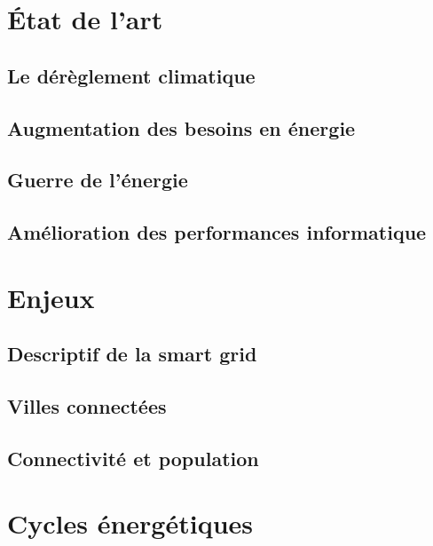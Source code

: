 \chapter{État de l’art}
\section{Le dérèglement climatique}
\lipsum
\section{Augmentation des besoins en énergie}
\lipsum
\section{Guerre de l'énergie}
\lipsum
\section{Amélioration des performances informatique}
\lipsum

\chapter{Enjeux}
\section{Descriptif de la smart grid}
\lipsum




\section{Villes connectées}
\lipsum

\section{Connectivité et population}
\lipsum

\chapter{Cycles énergétiques}
